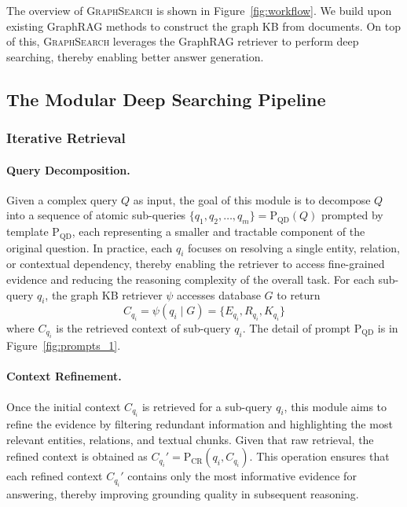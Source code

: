 The overview of \textsc{GraphSearch} is shown in Figure~\ref{fig:workflow}. We build upon existing GraphRAG methods to construct the graph KB from documents. On top of this, \textsc{GraphSearch} leverages the GraphRAG retriever to perform deep searching, thereby enabling better answer generation.

\subsection{The Modular Deep Searching Pipeline}
\subsubsection{Iterative Retrieval}

\paragraph{Query Decomposition.}
Given a complex query $Q$ as input, the goal of this module is to decompose $Q$ into a sequence of atomic sub-queries $\{q_1, q_2, \dots, q_m\} = \mathrm{P}_{\mathrm{QD}}(Q)$ prompted by template $\mathrm{P}_{\mathrm{QD}}$, each representing a smaller and tractable component of the original question. In practice, each $q_i$ focuses on resolving a single entity, relation, or contextual dependency, thereby enabling the retriever to access fine-grained evidence and reducing the reasoning complexity of the overall task. For each sub-query $q_i$, the graph KB retriever $\psi$ accesses database $G$ to return 
\begin{equation}
    C_{q_i} = \psi(q_i \mid G) = \{E_{q_i}, R_{q_i}, K_{q_i}\}
\end{equation}
where $C_{q_i}$ is the retrieved context of sub-query $q_i$. The detail of prompt $\mathrm{P}_{\mathrm{QD}}$ is in Figure~\ref{fig:prompts_1}.

\paragraph{Context Refinement.}
Once the initial context $C_{q_i}$ is retrieved for a sub-query $q_i$, this module aims to refine the evidence by filtering redundant information and highlighting the most relevant entities, relations, and textual chunks. Given that raw retrieval, the refined context is obtained as $C_{q_i}' = \mathrm{P}_{\mathrm{CR}}(q_i, C_{q_i})$. This operation ensures that each refined context $C_{q_i}'$ contains only the most informative evidence for answering, thereby improving grounding quality in subsequent reasoning.

